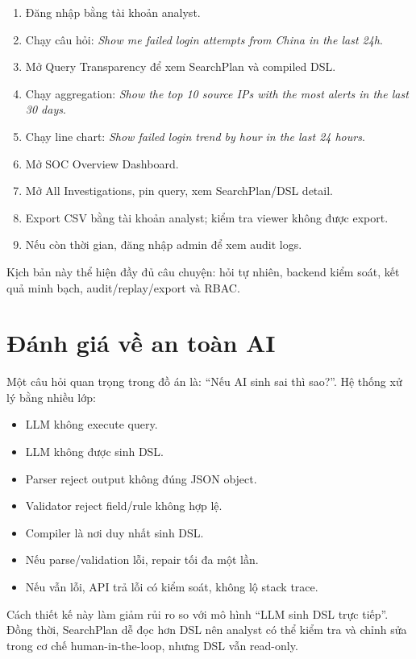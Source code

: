 \documentclass[12pt,a4paper]{report}
\begin{document}
\begin{enumerate}
    \item Đăng nhập bằng tài khoản analyst.
    \item Chạy câu hỏi: \textit{Show me failed login attempts from China in the last 24h}.
    \item Mở Query Transparency để xem SearchPlan và compiled DSL.
    \item Chạy aggregation: \textit{Show the top 10 source IPs with the most alerts in the last 30 days}.
    \item Chạy line chart: \textit{Show failed login trend by hour in the last 24 hours}.
    \item Mở SOC Overview Dashboard.
    \item Mở All Investigations, pin query, xem SearchPlan/DSL detail.
    \item Export CSV bằng tài khoản analyst; kiểm tra viewer không được export.
    \item Nếu còn thời gian, đăng nhập admin để xem audit logs.
\end{enumerate}

Kịch bản này thể hiện đầy đủ câu chuyện: hỏi tự nhiên, backend kiểm soát, kết quả minh bạch, audit/replay/export và RBAC.

\section{Đánh giá về an toàn AI}

Một câu hỏi quan trọng trong đồ án là: ``Nếu AI sinh sai thì sao?''. Hệ thống xử lý bằng nhiều lớp:

\begin{itemize}
    \item LLM không execute query.
    \item LLM không được sinh DSL.
    \item Parser reject output không đúng JSON object.
    \item Validator reject field/rule không hợp lệ.
    \item Compiler là nơi duy nhất sinh DSL.
    \item Nếu parse/validation lỗi, repair tối đa một lần.
    \item Nếu vẫn lỗi, API trả lỗi có kiểm soát, không lộ stack trace.
\end{itemize}

Cách thiết kế này làm giảm rủi ro so với mô hình ``LLM sinh DSL trực tiếp''. Đồng thời, SearchPlan dễ đọc hơn DSL nên analyst có thể kiểm tra và chỉnh sửa trong cơ chế human-in-the-loop, nhưng DSL vẫn read-only.
\end{document}
